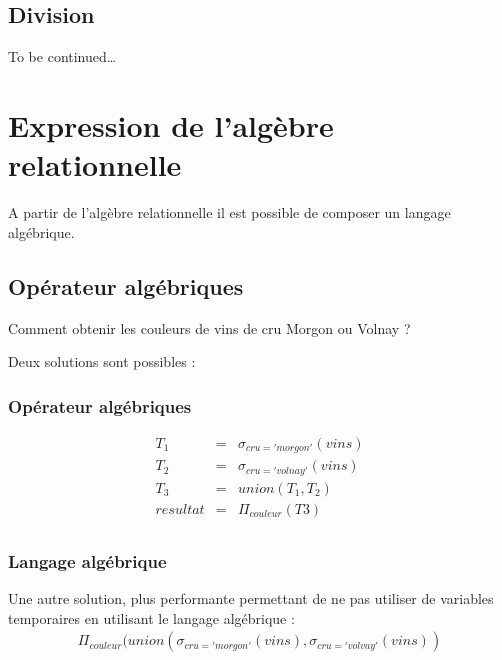 \documentclass[12pt,a4paper,openany]{book}
\begin{document}
	\subsection{Division}
	To be continued\ldots

	\begin{definition}
		
	\end{definition}

	\begin{notation}
		
	\end{notation}

	\section{Expression de l'algèbre relationnelle}
	A partir de l'algèbre relationnelle il est possible de composer un langage algébrique.
	\subsection{Opérateur algébriques}
	Comment obtenir les couleurs de vins de cru Morgon ou Volnay ? 	

	Deux solutions sont possibles : 
	\subsubsection{Opérateur algébriques}
	\begin{eqnarray*}
		T_1 &=& \sigma_{cru='morgon'}(vins)\\
		T_2 &=&  \sigma_{cru='volnay'}(vins)\\
		T_3 &=& union(T_1, T_2)\\
		resultat &=& \Pi_{couleur}(T3)\\
	\end{eqnarray*}

	\subsubsection{Langage algébrique}
	Une autre solution, plus performante permettant de ne pas utiliser de variables temporaires en utilisant le langage algébrique : 
	\begin{eqnarray*}
		\Pi_{couleur}(union(\sigma_{cru='morgon'}(vins), \sigma_{cru='volvay'}(vins))
	\end{eqnarray*}
\end{document}
